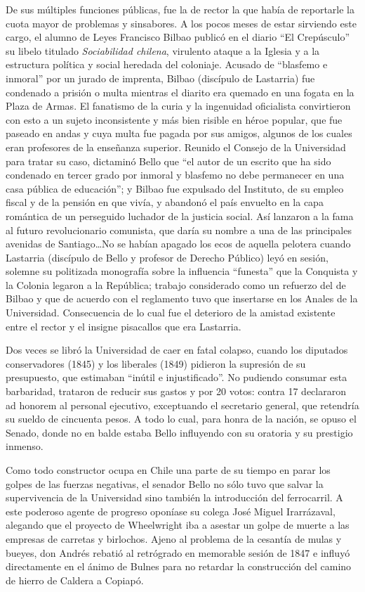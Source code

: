 \documentclass[10pt,twoside,openright]{memoir}
\begin{document}
De sus múltiples funciones públicas, fue la de rector la que había de
reportarle la cuota mayor de problemas y sinsabores. A los pocos meses
de estar sirviendo este cargo, el alumno de Leyes Francisco Bilbao
publicó en el diario ``El Crepúsculo'' su libelo titulado
\emph{Sociabilidad chilena}, virulento ataque a la Iglesia y a la
estructura política y social heredada del coloniaje. Acusado de
``blasfemo e inmoral'' por un jurado de imprenta, Bilbao (discípulo de
Lastarria) fue condenado a prisión o multa mientras el diarito era
quemado en una fogata en la Plaza de Armas. El fanatismo de la curia y
la ingenuidad oficialista convirtieron con esto a un sujeto
inconsistente y más bien risible en héroe popular, que fue paseado en
andas y cuya multa fue pagada por sus amigos, algunos de los cuales eran
profesores de la enseñanza superior. Reunido el Consejo de la
Universidad para tratar su caso, dictaminó Bello que ``el autor de un
escrito que ha sido condenado en tercer grado por inmoral y blasfemo no
debe permanecer en una casa pública de educación''; y Bilbao fue
expulsado del Instituto, de su empleo fiscal y de la pensión en que
vivía, y abandonó el país envuelto en la capa romántica de un perseguido
luchador de la justicia social. Así lanzaron a la fama al futuro
revolucionario comunista, que daría su nombre a una de las principales
avenidas de Santiago\ldots No se habían apagado los ecos de aquella
pelotera cuando Lastarria (discípulo de Bello y profesor de Derecho
Público) leyó en sesión, solemne su politizada monografía sobre la
influencia ``funesta'' que la Conquista y la Colonia legaron a la
República; trabajo considerado como un refuerzo del de Bilbao y que de
acuerdo con el reglamento tuvo que insertarse en los Anales de la
Universidad. Consecuencia de lo cual fue el deterioro de la amistad
existente entre el rector y el insigne pisacallos que era Lastarria.

Dos veces se libró la Universidad de caer en fatal colapso, cuando los
diputados conservadores (1845) y los liberales (1849) pidieron la
supresión de su presupuesto, que estimaban ``inútil e injustificado''. No
pudiendo consumar esta barbaridad, trataron de reducir sus gastos y por
20 votos: contra 17 declararon ad honorem al personal ejecutivo,
exceptuando el secretario general, que retendría su sueldo de cincuenta
pesos. A todo lo cual, para honra de la nación, se opuso el Senado,
donde no en balde estaba Bello influyendo con su oratoria y su prestigio
inmenso.

Como todo constructor ocupa en Chile una parte de su tiempo en parar los
golpes de las fuerzas negativas, el senador Bello no sólo tuvo que
salvar la supervivencia de la Universidad sino también la introducción
del ferrocarril. A este poderoso agente de progreso oponíase su colega
José Miguel Irarrázaval, alegando que el proyecto de Wheelwright iba a
asestar un golpe de muerte a las empresas de carretas y birlochos. Ajeno
al problema de la cesantía de mulas y bueyes, don Andrés rebatió al
retrógrado en memorable sesión de 1847 e influyó directamente en el
ánimo de Bulnes para no retardar la construcción del camino de hierro de
Caldera a Copiapó.
\end{document}
